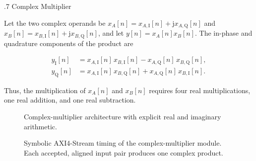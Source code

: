 %
%
\bigskip
{}
.7  \quad Complex Multiplier

Let the two complex operands be $x_A[n]=x_{A,\mathrm{I}}[n]+\mathrm{j}x_{A,\mathrm{Q}}[n]$ and $x_B[n]=x_{B,\mathrm{I}}[n]+\mathrm{j}x_{B,\mathrm{Q}}[n]$, and let $y[n]=x_A[n]x_B[n]$.  The in-phase and quadrature components of the product are

\begin{align*}
y_{\mathrm{I}}[n] &= x_{A,\mathrm{I}}[n] \, x_{B,\mathrm{I}}[n]-x_{A,\mathrm{Q}}[n] \, x_{B,\mathrm{Q}}[n], \\
y_{\mathrm{Q}}[n] &= x_{A,\mathrm{I}}[n] \, x_{B,\mathrm{Q}}[n]+x_{A,\mathrm{Q}}[n] \, x_{B,\mathrm{I}}[n].
\end{align*}

Thus, the multiplication of $x_A[n]$ and $x_B[n]$ requires four real multiplications, one real addition, and one real subtraction.

\begin{figure}[H]
\begin{center}
\resizebox{\textwidth}{!}{}
\caption{Complex-multiplier architecture with explicit real and imaginary arithmetic.}
\label{fig:cmultiplier}
\end{center}
\end{figure}

\begin{figure}[H]
\begin{center}
\resizebox{0.96\textwidth}{!}{}
\caption{Symbolic AXI4-Stream timing of the complex-multiplier module. Each accepted, aligned input pair produces one complex product.}
\label{fig:1_ComplexMult}
\end{center}
\end{figure}

